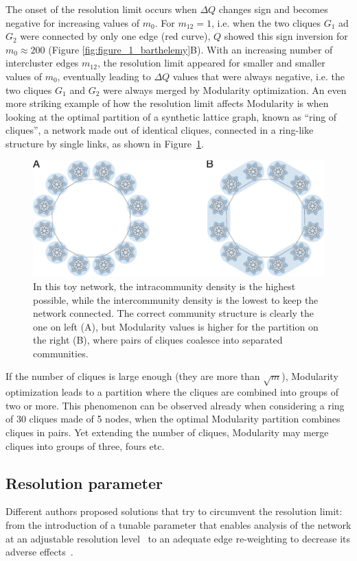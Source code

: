 The onset of the resolution limit occurs when $\Delta Q$ changes sign and becomes negative for increasing values of $m_0$.
For $m_{12}=1$, i.e. when the two cliques $G_1$ ad $G_2$ were connected by only one edge (red curve), $Q$ showed this sign inversion for $m_0 \approx 200$ (Figure \ref{fig:figure_1_barthelemy}B).
With an increasing number of intercluster edges $m_{12}$, the resolution limit appeared for smaller and smaller values of $m_0$, eventually leading to $\Delta Q$ values that were always negative, i.e. the two cliques $G_1$ and $G_2$ were always merged by Modularity optimization.
An even more striking example of how the resolution limit affects Modularity is when looking at the optimal partition of a synthetic lattice graph, known as ``ring of cliques'', a network made out of identical cliques, connected in a ring-like structure by single links, as shown in Figure~\ref{fig:traag_ring_of_cliques}. 

\begin{figure}[htb!]
\centering
\includegraphics[width=1\textwidth]{images/traag_ring_of_cliques.pdf}
\caption{In this toy network, the intracommunity density is the highest possible, while the intercommunity density is the lowest to keep the network connected. The correct community structure is clearly the one on left (A), but Modularity values is higher for the partition on the right (B), where pairs of cliques coalesce into separated communities.}
\label{fig:traag_ring_of_cliques}
\end{figure}
If the number of cliques is large enough (they are more than $\sqrt{m}$), Modularity optimization leads to a partition where the cliques are combined into groups of two or more. This phenomenon can be observed already when considering a ring of 30 cliques made of 5 nodes, when the optimal Modularity partition combines cliques in pairs.
Yet extending the number of cliques, Modularity may merge cliques into groups of three, fours etc.

\subsection{Resolution parameter}\label{sec:resolution_parameter}
Different authors proposed solutions that try to circumvent the resolution limit: from the introduction of a tunable parameter that enables analysis of the network at an adjustable resolution level~\cite{reichardt2006,ronhovde2010,yeo2011} to an adequate edge re-weighting to decrease its adverse effects~\cite{berry2011}.

